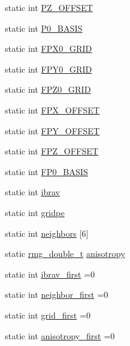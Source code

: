 \begin{DoxyCompactItemize}
\item 
static int \hyperlink{class_base_grid_abda1ba4dad93bab180bf9ceb89458910}{P\-Z\-\_\-\-O\-F\-F\-S\-E\-T}
\item 
static int \hyperlink{class_base_grid_a80432bbc9fd8643120ca82ffd9e98b18}{P0\-\_\-\-B\-A\-S\-I\-S}
\item 
static int \hyperlink{class_base_grid_a01e7d1294f2ec4534634be3e634e2a68}{F\-P\-X0\-\_\-\-G\-R\-I\-D}
\item 
static int \hyperlink{class_base_grid_a9fef749119b50c842be6ff443d466566}{F\-P\-Y0\-\_\-\-G\-R\-I\-D}
\item 
static int \hyperlink{class_base_grid_a645065c15da5e435b6e9ea31c88557dc}{F\-P\-Z0\-\_\-\-G\-R\-I\-D}
\item 
static int \hyperlink{class_base_grid_ae6589343954bde3ef4e42fa6c6d251cf}{F\-P\-X\-\_\-\-O\-F\-F\-S\-E\-T}
\item 
static int \hyperlink{class_base_grid_a78a8a4bb7cab0f3fd399c30e6ba20ac3}{F\-P\-Y\-\_\-\-O\-F\-F\-S\-E\-T}
\item 
static int \hyperlink{class_base_grid_aa987bbc7146b6a0e615ccbced998205a}{F\-P\-Z\-\_\-\-O\-F\-F\-S\-E\-T}
\item 
static int \hyperlink{class_base_grid_aa68acf098c091d140937c15e4010d18a}{F\-P0\-\_\-\-B\-A\-S\-I\-S}
\item 
static int \hyperlink{class_base_grid_a2c246551b0c88227026f3472a48fe9b3}{ibrav}
\item 
static int \hyperlink{class_base_grid_a50dfa474999fe8be113d27619f102283}{gridpe}
\item 
static int \hyperlink{class_base_grid_a25b59964f1818bf084e0a44ee83067e0}{neighbors} \mbox{[}6\mbox{]}
\item 
static \hyperlink{rmgtypes_8h_aaa16921c14f121c56eaa42390a340db8}{rmg\-\_\-double\-\_\-t} \hyperlink{class_base_grid_a94e75cceb5af2a28d65840e32bf3ebf0}{anisotropy}
\item 
static int \hyperlink{class_base_grid_ad7c2595653d4d26bef477c9570be3111}{ibrav\-\_\-first} =0
\item 
static int \hyperlink{class_base_grid_a08453fb8239193d2d3a08574ae5068a7}{neighbor\-\_\-first} =0
\item 
static int \hyperlink{class_base_grid_ae9f27369fd1f589f362f9bb6001d4bfa}{grid\-\_\-first} =0
\item 
static int \hyperlink{class_base_grid_ae6b32024676eb5c27fcb4abad5982f8d}{anisotropy\-\_\-first} =0
\end{DoxyCompactItemize}


